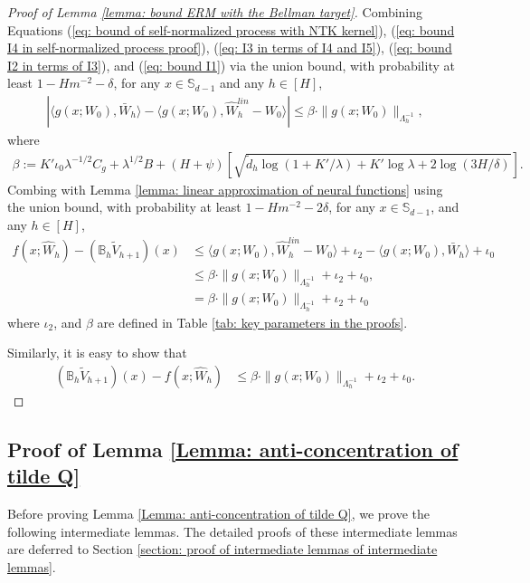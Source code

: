 \documentclass{article} \usepackage{iclr2023/iclr2023_conference,times}
\begin{document}
\begin{proof}[Proof of Lemma \ref{lemma: bound ERM with the Bellman target}]
Combining Equations (\ref{eq: bound of self-normalized process with NTK kernel}), (\ref{eq: bound I4 in self-normalized process proof}), (\ref{eq: I3 in terms of I4 and I5}), (\ref{eq: bound I2 in terms of I3}), and (\ref{eq: bound I1}) via the union bound, with probability at least $1 - H m^{-2} - \delta$, for any $x \in \mathbb{S}_{d-1}$ and any $h \in [H]$,
\begin{align*}
    |\langle g(x; W_0), \bar{W}_h \rangle -  \langle g(x; W_0), \hat{W}^{lin}_h - W_0 \rangle | \leq \beta \cdot \| g(x; W_0) \|_{\Lambda_h^{-1}}, 
\end{align*}
where 
\begin{align}
    \beta := K' \iota_0 \lambda^{-1/2} C_g + \lambda^{1/2}  B + (H + \psi) \left[ \sqrt{\tilde{d}_h \log (1 + K' / \lambda) + K' \log \lambda + 2 \log (3 H / \delta)} \right]. 
    \label{equation: confidence multiplier beta}
\end{align}
Combing with Lemma \ref{lemma: linear approximation of neural functions} using the union bound, with probability at least $ 1 - H   m^{-2} - 2\delta$, for any $x \in \mathbb{S}_{d-1}$, and any $h \in [H]$,
\begin{align*}
    f(x; \hat{W}_h) - (\mathbb{B}_h \tilde{V}_{h+1})(x) &\leq \langle g(x; W_0), \hat{W}^{lin}_h - W_0 \rangle + \iota_2  -  \langle g(x; W_0), \bar{W}_h \rangle + \iota_0 \\
    &\leq \beta \cdot \| g(x; W_0) \|_{\Lambda_h^{-1}} + \iota_2 + \iota_0 , \\
    &= \beta  \cdot \| g(x; W_0) \|_{\Lambda_h^{-1}} + \iota_2 + \iota_0
\end{align*}
where $\iota_2$, and $\beta$ are defined in Table \ref{tab: key parameters in the proofs}.


Similarly, it is easy to show that  
\begin{align*}
    (\mathbb{B}_h \tilde{V}_{h+1})(x) - f(x; \hat{W}_h)
    &\leq \beta  \cdot \| g(x; W_0) \|_{\Lambda_h^{-1}} + \iota_2 + \iota_0. 
\end{align*}

\end{proof} 

\subsection{Proof of Lemma \ref{Lemma: anti-concentration of tilde Q}}

Before proving Lemma \ref{Lemma: anti-concentration of tilde Q}, we prove the following intermediate lemmas. The detailed proofs of these intermediate lemmas are deferred to Section \ref{section: proof of intermediate lemmas of intermediate lemmas}. 
\end{document}
